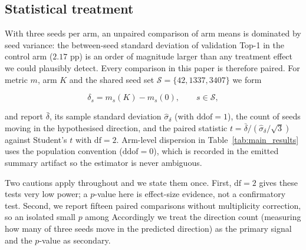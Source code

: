 \subsection{Statistical treatment}

With three seeds per arm, an unpaired comparison of arm means is dominated by
seed variance: the between-seed standard deviation of validation Top-1 in the
control arm ($2.17$ pp) is an order of magnitude larger than any treatment
effect we could plausibly detect. Every comparison in this paper is therefore
paired. For metric $m$, arm $K$ and the shared seed set
$\mathcal{S} = \{42, 1337, 3407\}$ we form

\begin{equation}
\delta_s = m_s(K) - m_s(0), \qquad s \in \mathcal{S},
\end{equation}

and report $\bar{\delta}$, its sample standard deviation $\hat{\sigma}_\delta$
(with $\mathrm{ddof} = 1$), the count of seeds moving in the hypothesised
direction, and the paired statistic
$t = \bar{\delta} / (\hat{\sigma}_\delta / \sqrt{3})$ against Student's $t$ with
$\mathrm{df} = 2$. Arm-level dispersion in Table~\ref{tab:main_results} uses the
population convention ($\mathrm{ddof} = 0$), which is recorded in the emitted
summary artifact so the estimator is never ambiguous.

Two cautions apply throughout and we state them once. First,
$\mathrm{df} = 2$ gives these tests very low power; a $p$-value here is
effect-size evidence, not a confirmatory test. Second, we report fifteen paired
comparisons without multiplicity correction, so an isolated small $p$ among
Accordingly we treat the direction count (measuring how many of
three seeds move in the predicted direction) as the primary signal and the $p$-value as
secondary.
